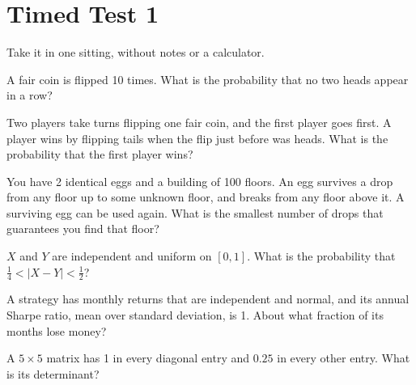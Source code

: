 \chapter{Timed Test 1}\label{ch:iv1:timed-test-1}

\begin{ivtrains}
Take it in one sitting, without notes or a calculator.
\end{ivtrains}


\begin{question}\label{iq:iv1:timed-test-1:1}
A fair coin is flipped 10 times. What is the probability that no two heads appear in a row?
\end{question}

\begin{question}\label{iq:iv1:timed-test-1:2}
Two players take turns flipping one fair coin, and the first player goes first. A player wins by flipping tails when the flip just before was heads. What is the probability that the first player wins?
\end{question}

\begin{question}\label{iq:iv1:timed-test-1:3}
You have 2 identical eggs and a building of 100 floors. An egg survives a drop from any floor up to some unknown floor, and breaks from any floor above it. A surviving egg can be used again. What is the smallest number of drops that guarantees you find that floor?
\end{question}

\begin{question}\label{iq:iv1:timed-test-1:4}
$X$ and $Y$ are independent and uniform on $[0, 1]$. What is the probability that $\tfrac14 < |X - Y| < \tfrac12$?
\end{question}

\begin{question}\label{iq:iv1:timed-test-1:5}
A strategy has monthly returns that are independent and normal, and its annual Sharpe ratio, mean over standard deviation, is 1. About what fraction of its months lose money?
\end{question}

\begin{question}\label{iq:iv1:timed-test-1:6}
A $5 \times 5$ matrix has 1 in every diagonal entry and $0.25$ in every other entry. What is its determinant?
\end{question}


